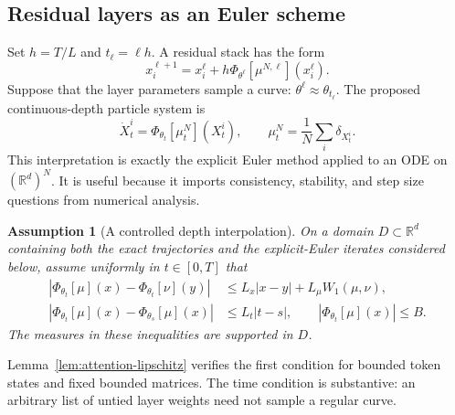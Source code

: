 \documentclass[11pt]{amsart}
\numberwithin{equation}{section}
\theoremstyle{plain}
\newtheorem{assumption}[theorem]{Assumption}
\newcommand{\R}{\mathbb{R}}
\newcommand{\abs}[1]{\left\lvert#1\right\rvert}
\begin{document}
\subsection{Residual layers as an Euler scheme}
Set $h=T/L$ and $t_\ell=\ell h$.  A residual stack has the form
\begin{equation}\label{eq:residual-euler}
 x_i^{\ell+1}
 =x_i^\ell+h\Phi_{\theta^\ell}[\mu^{N,\ell}](x_i^\ell).
\end{equation}
Suppose that the layer parameters sample a curve:
$\theta^\ell\approx\theta_{t_\ell}$.  The proposed continuous-depth particle
system is
\begin{equation}\label{eq:token-ode}
    \dot X_t^i=\Phi_{\theta_t}[\mu_t^N](X_t^i),
    \qquad \mu_t^N=\frac1N\sum_i\delta_{X_t^i}.
\end{equation}
This interpretation is exactly the explicit Euler method applied to an ODE on
$(\R^d)^N$.  It is useful because it imports consistency, stability, and step
size questions from numerical analysis.

\begin{assumption}[A controlled depth interpolation]\label{ass:depth}
On a domain $D\subset\R^d$ containing both the exact trajectories and the
explicit-Euler iterates considered below, assume uniformly in $t\in[0,T]$ that
\begin{align}
 \abs{\Phi_{\theta_t}[\mu](x)-\Phi_{\theta_t}[\nu](y)}
 &\leq L_x\abs{x-y}+L_\mu W_1(\mu,\nu),
 \label{eq:depth-lipschitz}\\
 \abs{\Phi_{\theta_t}[\mu](x)-\Phi_{\theta_s}[\mu](x)}
 &\leq L_t\abs{t-s},\qquad
 \abs{\Phi_{\theta_t}[\mu](x)}\leq B.
 \label{eq:depth-time}
\end{align}
The measures in these inequalities are supported in $D$.
\end{assumption}
Lemma~\ref{lem:attention-lipschitz} verifies the first condition for bounded
token states and fixed bounded matrices.  The time condition is substantive:
an arbitrary list of untied layer weights need not sample a regular curve.
\end{document}
